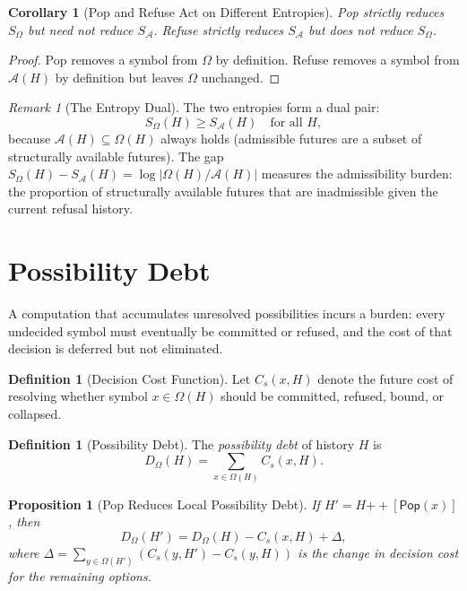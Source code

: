 \documentclass[12pt, a4paper, openany]{book}
\theoremstyle{plain}
\newtheorem{proposition}[theorem]{Proposition}
\newtheorem{corollary}[theorem]{Corollary}
\theoremstyle{definition}
\newtheorem{definition}[theorem]{Definition}
\theoremstyle{remark}
\newtheorem{remark}[theorem]{Remark}
\newcommand{\Pop}{\mathsf{Pop}}
\newcommand{\calA}{\mathcal{A}}
\begin{document}
\begin{corollary}[Pop and Refuse Act on Different Entropies]
Pop strictly reduces $S_\Omega$ but need not reduce $S_{\calA}$.
Refuse strictly reduces $S_{\calA}$ but does not reduce $S_\Omega$.
\end{corollary}

\begin{proof}
Pop removes a symbol from $\Omega$ by definition. Refuse removes a symbol from
$\calA(H)$ by definition but leaves $\Omega$ unchanged.
\end{proof}

\begin{remark}[The Entropy Dual]
The two entropies form a dual pair:
\[
S_\Omega(H) \geq S_{\calA}(H) \quad \text{for all } H,
\]
because $\calA(H) \subseteq \Omega(H)$ always holds (admissible futures are
a subset of structurally available futures). The gap $S_\Omega(H) - S_{\calA}(H) = \log|\Omega(H)/\calA(H)|$
measures the admissibility burden: the proportion of structurally available
futures that are inadmissible given the current refusal history.
\end{remark}

\section{Possibility Debt}

A computation that accumulates unresolved possibilities incurs a burden: every
undecided symbol must eventually be committed or refused, and the cost of that
decision is deferred but not eliminated.

\begin{definition}[Decision Cost Function]
Let $C_s(x, H)$ denote the future cost of resolving whether symbol
$x \in \Omega(H)$ should be committed, refused, bound, or collapsed.
\end{definition}

\begin{definition}[Possibility Debt]
The \emph{possibility debt} of history $H$ is
\[
D_\Omega(H) = \sum_{x \in \Omega(H)} C_s(x, H).
\]
\end{definition}

\begin{proposition}[Pop Reduces Local Possibility Debt]
If $H' = H \mathbin{++} [\Pop(x)]$, then
\[
D_\Omega(H') = D_\Omega(H) - C_s(x, H) + \Delta,
\]
where $\Delta = \sum_{y \in \Omega(H')} (C_s(y, H') - C_s(y, H))$ is the
change in decision cost for the remaining options.
\end{proposition}
\end{document}
